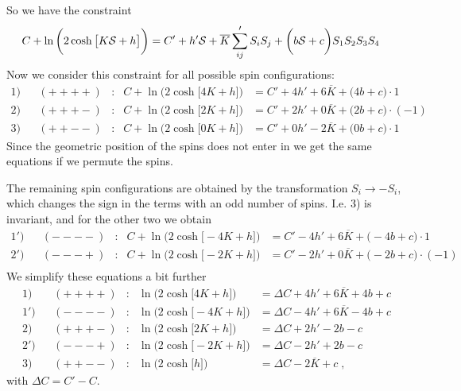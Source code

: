 So we have the constraint
%
\begin{align}\label{eq:constr}
C + \ln\bigg(2\cosh\big[K{\cal S} +h  \big]  \bigg)&=
C' + h' {\cal S} + \overline K \sum'_{ij} S_{i}S_{j}  +
\bigg(b{\cal S} + c\bigg) S_{1}S_{2}S_{3}S_{4}
\end{align}
%
Now we consider this constraint for all possible spin configurations:
%
\begin{align*}
1)&&(++++)&:&C + \ln\bigg(2\cosh\big[4 K+h  \big]  \bigg) &=
C' + 4 h'  + 6 \overline K   + \big(4b+c\big)\cdot 1 \\
2)&&(+++-)&:&C + \ln\bigg(2\cosh\big[2 K+h  \big]  \bigg) &=
C' + 2 h'  + 0 \overline K   + \big(2b+c\big)\cdot (-1) \\
3)&&(++--)&:&C + \ln\bigg(2\cosh\big[0K+h  \big]  \bigg) &=
C' + 0 h'  - 2 \overline K   + \big(0b+c\big)\cdot 1 \;
\end{align*}
%
Since the geometric position of the spins does not enter in  we get the same equations if we permute the spins.

%
The remaining spin configurations
are obtained by the transformation $S_{i}\to - S_{i}$, which changes the sign in the terms with an odd number of spins. I.e. 3) is invariant, and for the other two we obtain
\begin{align*}
1')&&(----)&:&C + \ln\bigg(2\cosh\big[-4 K+h  \big]  \bigg) &=
C' - 4 h'  + 6 \overline K   + \big(-4b+c\big)\cdot 1 \\
2')&&(---+)&:&C + \ln\bigg(2\cosh\big[-2 K+h  \big]  \bigg) &=
C' - 2 h'  + 0 \overline K   + \big(-2b+c\big)\cdot (-1) \\
\end{align*}
%
We simplify these equations a bit further
\begin{align*}
1)&&(++++)&:& \ln\bigg(2\cosh\big[4 K+h  \big]  \bigg) &=
\Delta C + 4 h'  + 6 \overline K   + 4b+c \\
1')&&(----)&:& \ln\bigg(2\cosh\big[-4 K+h  \big]  \bigg) &=
\Delta C  - 4 h'  + 6 \overline K   -4b+c \\
2)&&(+++-)&:&\ln\bigg(2\cosh\big[2 K+h  \big]  \bigg) &=
\Delta C + 2 h'   - 2b-c \\
2')&&(---+)&:&\ln\bigg(2\cosh\big[-2 K+h  \big]  \bigg) &=
\Delta C - 2 h'     + 2b-c\\
3)&&(++--)&:& \ln\bigg(2\cosh\big[h  \big]  \bigg) &=
\Delta C - 2 \overline K   + c \;,
\end{align*}
%
with $\Delta C = C'-C$. 

